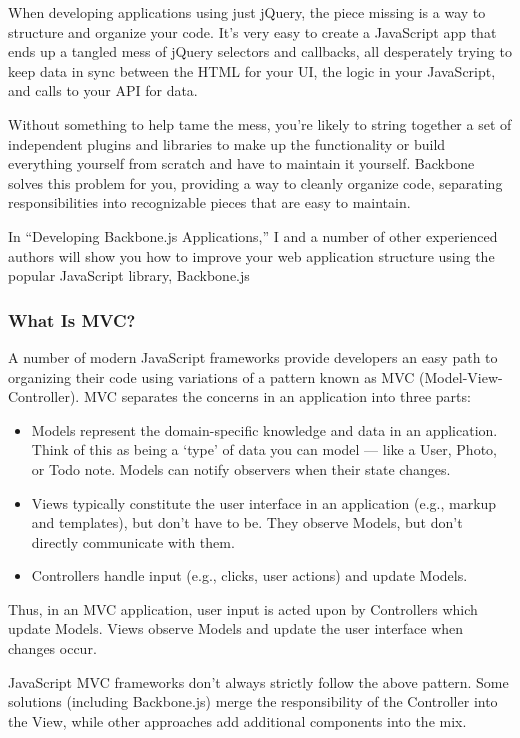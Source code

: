 \documentclass[9pt]{book}
\begin{document}
When developing applications using just jQuery, the piece missing is a
way to structure and organize your code. It's very easy to create a
JavaScript app that ends up a tangled mess of jQuery selectors and
callbacks, all desperately trying to keep data in sync between the HTML
for your UI, the logic in your JavaScript, and calls to your API for
data.

Without something to help tame the mess, you're likely to string
together a set of independent plugins and libraries to make up the
functionality or build everything yourself from scratch and have to
maintain it yourself. Backbone solves this problem for you, providing a
way to cleanly organize code, separating responsibilities into
recognizable pieces that are easy to maintain.

In ``Developing Backbone.js Applications,'' I and a number of other
experienced authors will show you how to improve your web application
structure using the popular JavaScript library, Backbone.js

\subsubsection{What Is MVC?}\label{what-is-mvc}

A number of modern JavaScript frameworks provide developers an easy path
to organizing their code using variations of a pattern known as MVC
(Model-View-Controller). MVC separates the concerns in an application
into three parts:

\begin{itemize}
\itemsep1pt\parskip0pt
\item
  Models represent the domain-specific knowledge and data in an
  application. Think of this as being a `type' of data you can model ---
  like a User, Photo, or Todo note. Models can notify observers when
  their state changes.
\item
  Views typically constitute the user interface in an application (e.g.,
  markup and templates), but don't have to be. They observe Models, but
  don't directly communicate with them.
\item
  Controllers handle input (e.g., clicks, user actions) and update
  Models.
\end{itemize}

Thus, in an MVC application, user input is acted upon by Controllers
which update Models. Views observe Models and update the user interface
when changes occur.

JavaScript MVC frameworks don't always strictly follow the above
pattern. Some solutions (including Backbone.js) merge the responsibility
of the Controller into the View, while other approaches add additional
components into the mix.
\end{document}
